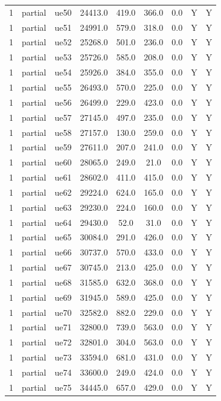 \begin{table}[ht]
\begin{tabular}{|c|c|c|c|c|c|c|c|c|}
1 & partial & ue50 & 24413.0 & 419.0 & 366.0 & 0.0 & Y & Y \\
1 & partial & ue51 & 24991.0 & 579.0 & 318.0 & 0.0 & Y & Y \\
1 & partial & ue52 & 25268.0 & 501.0 & 236.0 & 0.0 & Y & Y \\
1 & partial & ue53 & 25726.0 & 585.0 & 208.0 & 0.0 & Y & Y \\
1 & partial & ue54 & 25926.0 & 384.0 & 355.0 & 0.0 & Y & Y \\
1 & partial & ue55 & 26493.0 & 570.0 & 225.0 & 0.0 & Y & Y \\
1 & partial & ue56 & 26499.0 & 229.0 & 423.0 & 0.0 & Y & Y \\
1 & partial & ue57 & 27145.0 & 497.0 & 235.0 & 0.0 & Y & Y \\
1 & partial & ue58 & 27157.0 & 130.0 & 259.0 & 0.0 & Y & Y \\
1 & partial & ue59 & 27611.0 & 207.0 & 241.0 & 0.0 & Y & Y \\
1 & partial & ue60 & 28065.0 & 249.0 & 21.0 & 0.0 & Y & Y \\
1 & partial & ue61 & 28602.0 & 411.0 & 415.0 & 0.0 & Y & Y \\
1 & partial & ue62 & 29224.0 & 624.0 & 165.0 & 0.0 & Y & Y \\
1 & partial & ue63 & 29230.0 & 224.0 & 160.0 & 0.0 & Y & Y \\
1 & partial & ue64 & 29430.0 & 52.0 & 31.0 & 0.0 & Y & Y \\
1 & partial & ue65 & 30084.0 & 291.0 & 426.0 & 0.0 & Y & Y \\
1 & partial & ue66 & 30737.0 & 570.0 & 433.0 & 0.0 & Y & Y \\
1 & partial & ue67 & 30745.0 & 213.0 & 425.0 & 0.0 & Y & Y \\
1 & partial & ue68 & 31585.0 & 632.0 & 368.0 & 0.0 & Y & Y \\
1 & partial & ue69 & 31945.0 & 589.0 & 425.0 & 0.0 & Y & Y \\
1 & partial & ue70 & 32582.0 & 882.0 & 229.0 & 0.0 & Y & Y \\
1 & partial & ue71 & 32800.0 & 739.0 & 563.0 & 0.0 & Y & Y \\
1 & partial & ue72 & 32801.0 & 304.0 & 563.0 & 0.0 & Y & Y \\
1 & partial & ue73 & 33594.0 & 681.0 & 431.0 & 0.0 & Y & Y \\
1 & partial & ue74 & 33600.0 & 249.0 & 424.0 & 0.0 & Y & Y \\
1 & partial & ue75 & 34445.0 & 657.0 & 429.0 & 0.0 & Y & Y \\

\end{tabular}
\end{table}
